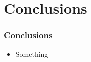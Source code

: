 \documentclass[hyperref={colorlinks=true}]{beamer}
\begin{document}
\section[Conclusions]{Conclusions}%

\begin{frame}%
  \frametitle{Conclusions}

  \begin{itemize}
    \item Something
  \end{itemize}
  
\end{frame}

\end{document}
